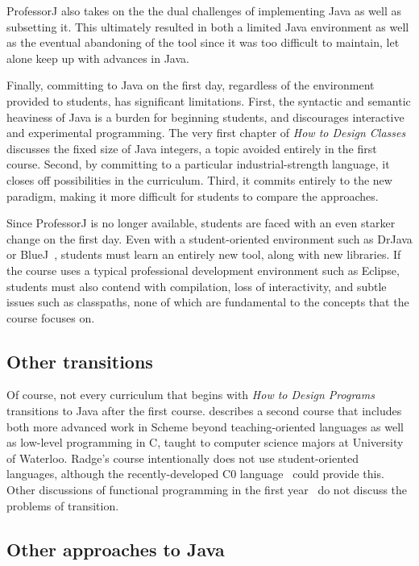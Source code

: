 \documentclass[submission,copyright]{eptcs}
\def\htdp{\emph{How to Design Programs}\xspace}
\def\htdc{\emph{How to Design Classes}\xspace}
\def\profj{{ProfessorJ}\xspace}
\begin{document}
\profj also takes on the the dual challenges of implementing Java as
well as subsetting it.  This ultimately resulted in both a limited
Java environment as well as the eventual abandoning of the tool since
it was too difficult to maintain, let alone keep up with advances in
Java.  

Finally, committing to Java on the first day, regardless of the
environment provided to students, has significant limitations.  First,
the syntactic and semantic heaviness of Java is a burden for beginning
students, and discourages interactive and experimental programming.
The very first chapter of \htdc discusses the fixed size of Java integers,
a topic avoided entirely in the first course.
Second, by committing to a particular industrial-strength language, it
closes off possibilities in the curriculum.  Third, it commits
entirely to the new paradigm, making it more difficult for students to
compare the approaches. 

Since \profj is no longer available, students are faced with an even
starker change on the first day.  Even with a student-oriented
environment such as DrJava or BlueJ~\cite{dvanhorn:Allen2002DrJava,
  dvanhorn:Hsia2005Taming}, students must learn an entirely new tool,
along with new libraries.
If the course uses a typical professional development environment such
as Eclipse, students must also contend with compilation, loss of
interactivity, and subtle issues such as classpaths, none of which are
fundamental to the concepts that the course focuses on.


\subsection{Other transitions}

Of course, not every curriculum that begins with \htdp transitions to
Java after the first course.  \citet{dvanhorn:Ragde2008Chilling}
describes a second course that includes both more advanced work in
Scheme beyond teaching-oriented languages as well as low-level
programming in C, taught to computer science majors at University of
Waterloo.  Radge's course intentionally does not use student-oriented
languages, although the recently-developed C0 language~\cite{local:c0}
could provide this. Other discussions of functional programming in the
first year~\cite{dvanhorn:Chakravarty2004Risks} do not discuss the
problems of transition.

\subsection{Other approaches to Java}
\end{document}
